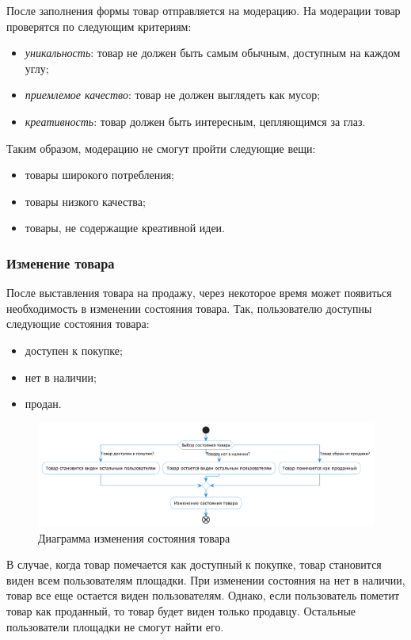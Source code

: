 \documentclass[a4paper,14pt]{extarticle}
\begin{document}
После заполнения формы товар отправляется на модерацию. На модерации товар проверятся по следующим критериям:
\begin{itemize}
    \item \textit{уникальность}: товар не должен быть самым обычным, доступным на каждом углу;
    \item \textit{приемлемое качество}: товар не должен выглядеть как мусор;
    \item \textit{креативность}: товар должен быть интересным, цепляющимся за глаз.
\end{itemize}
Таким образом, модерацию не смогут пройти следующие вещи:
\begin{itemize}
    \item товары широкого потребления;
    \item товары низкого качества;
    \item товары, не содержащие креативной идеи.
\end{itemize}

\subsubsection*{Изменение товара}

После выставления товара на продажу, через некоторое время может появиться необходимость в изменении состояния товара. Так, пользователю доступны следующие состояния товара:
\begin{itemize}
    \item доступен к покупке;
    \item нет в наличии;
    \item продан.
\end{itemize}

\begin{figure}[H]
    \centering
    \includegraphics[width=\textwidth]{images/change_item.png}
    \caption{Диаграмма изменения состояния товара}
\end{figure}

В случае, когда товар помечается как доступный к покупке, товар становится виден всем пользователям площадки. При изменении состояния на нет в наличии, товар все еще остается виден пользователям. Однако, если пользователь пометит товар как проданный, то товар будет виден только продавцу. Остальные пользователи площадки не смогут найти его.
\end{document}
